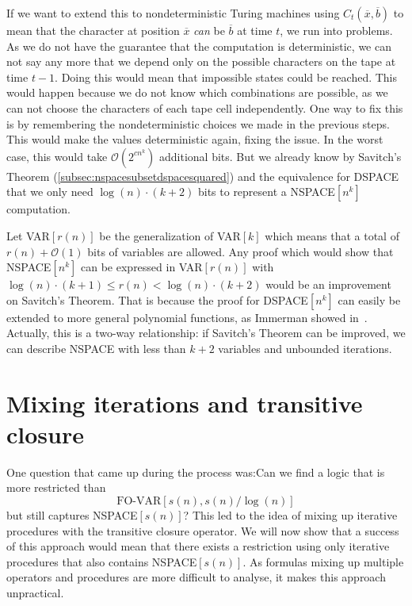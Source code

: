 If we want to extend this to nondeterministic Turing machines using $C_{t}(\overline{x}, \overline{b})$ to mean that the character at position $\overline{x}$ \emph{can} be $\overline{b}$ at time $t$, we run into problems.
As we do not have the guarantee that the computation is deterministic, we can not say any more that we depend only on the possible characters on the tape at time $t - 1$.
Doing this would mean that impossible states could be reached.
This would happen because we do not know which combinations are possible, as we can not choose the characters of each tape cell independently.
One way to fix this is by remembering the nondeterministic choices we made in the previous steps.
This would make the values deterministic again, fixing the issue.
In the worst case, this would take $\mathcal{O}(2^{cn^k})$ additional bits.
But we already know by Savitch's Theorem (\cref{subsec:nspacesubsetdspacesquared}) and the equivalence for DSPACE that we only need $\log(n) \cdot (k + 2)$ bits to represent a NSPACE$[n^k]$ computation.

Let VAR$[r(n)]$ be the generalization of VAR$[k]$ which means that a total of $r(n) + \mathcal{O}(1)$ bits of variables are allowed.
Any proof which would show that NSPACE$[n^k]$ can be expressed in VAR$[r(n)]$ with $\log(n) \cdot (k + 1) \leq r(n) < \log(n) \cdot (k + 2)$ would be an improvement on Savitch's Theorem.
That is because the proof for DSPACE$[n^k]$ can easily be extended to more general polynomial functions, as Immerman showed in~\cite{Immerman1999}.
Actually, this is a two-way relationship: if Savitch's Theorem can be improved, we can describe NSPACE with less than $k + 2$ variables and unbounded iterations.




\section{Mixing iterations and transitive closure}\label{sec:mixing-iterations-and-transitive-closure}

One question that came up during the process was:Can we find a logic that is more restricted than \[\text{FO-VAR}[s(n), s(n)/\log(n)]\] but still captures NSPACE$[s(n)]$?
This led to the idea of mixing up iterative procedures with the transitive closure operator.
We will now show that a success of this approach would mean that there exists a restriction using only iterative procedures that also contains NSPACE$[s(n)]$.
As formulas mixing up multiple operators and procedures are more difficult to analyse, it makes this approach unpractical.

